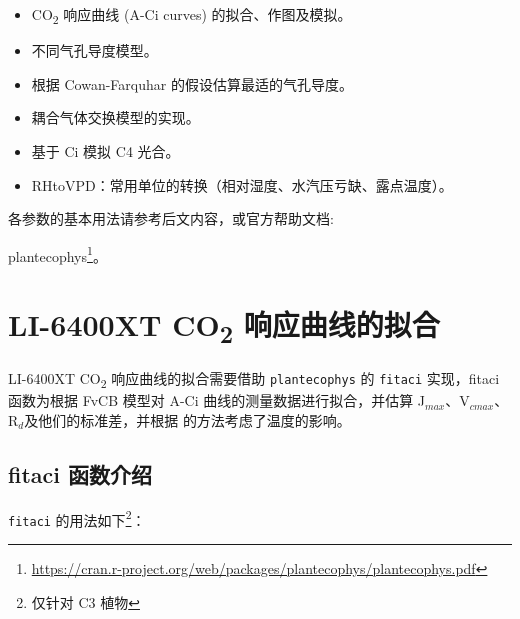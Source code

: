 \documentclass[
]{krantz}
\providecommand{\tightlist}{%
  \setlength{\itemsep}{0pt}\setlength{\parskip}{0pt}}
\renewcommand{\href}[2]{#2\footnote{\url{#1}}}
\begin{document}
\begin{itemize}
\tightlist
\item
  CO\textsubscript{2} 响应曲线 (A-Ci curves) 的拟合、作图及模拟。
\item
  不同气孔导度模型。
\item
  根据 Cowan-Farquhar 的假设估算最适的气孔导度。
\item
  耦合气体交换模型的实现。
\item
  基于 Ci 模拟 C4 光合。
\item
  RHtoVPD：常用单位的转换（相对湿度、水汽压亏缺、露点温度）。
\end{itemize}

各参数的基本用法请参考后文内容，或官方帮助文档:

\href{https://cran.r-project.org/web/packages/plantecophys/plantecophys.pdf}{plantecophys}。

\hypertarget{fit6400}{%
\section{\texorpdfstring{LI-6400XT CO\textsubscript{2} 响应曲线的拟合}{LI-6400XT CO2 响应曲线的拟合}}\label{fit6400}}

LI-6400XT CO\textsubscript{2} 响应曲线的拟合需要借助 \texttt{plantecophys} 的 \texttt{fitaci} 实现，fitaci 函数为根据 FvCB 模型对 A-Ci 曲线的测量数据进行拟合，并估算 J\(_{max}\)、V\(_{cmax}\)、R\(_{d}\)及他们的标准差，并根据
\citet{Medlyn2002Temperature} 的方法考虑了温度的影响。

\hypertarget{fitaci_intro}{%
\subsection{fitaci 函数介绍}\label{fitaci_intro}}

\texttt{fitaci} 的用法如下\footnote{仅针对 C3 植物}：
\end{document}
